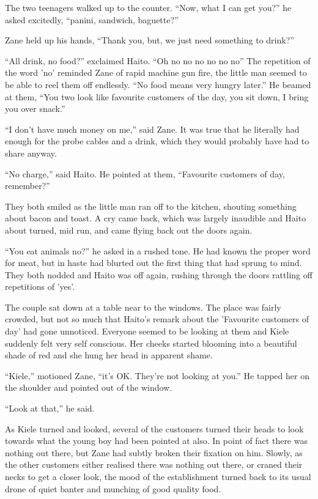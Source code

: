 The two teenagers walked up to the counter.  ``Now, what I can get you?'' he asked excitedly, ``panini, sandwich, baguette?''  

Zane held up his hands, ``Thank you, but, we just need something to drink?''

``All drink, no food?'' exclaimed Haito.  ``Oh no no no no no no''  The repetition of the word 'no' reminded Zane of rapid machine gun fire, the little man seemed to be able to reel them off endlessly.  ``No food means very hungry later.''  He beamed at them, ``You two look like favourite customers of the day, you sit down, I bring you over snack.''

``I don't have much money on me,'' said Zane.  It was true that he literally had enough for the probe cables and a drink, which they would probably have had to share anyway.

``No charge,'' said Haito.  He pointed at them, ``Favourite  customers of day, remember?''

They both smiled as the little man ran off to the kitchen, shouting something about bacon and toast.  A cry came back, which was largely inaudible and Haito about turned, mid run, and came flying back out the doors again.

``You eat animals no?'' he asked in a rushed tone.  He had known the proper word for meat, but in haste had blurted out the first thing that had sprung to mind.  They both nodded and Haito was off again, rushing through the doors rattling off repetitions of 'yes'.

The couple sat down at a table near to the windows.  The place was fairly crowded, but not so much that Haito's remark about the 'Favourite customers of day' had gone unnoticed.  Everyone seemed to be looking at them and Kiele suddenly felt very self conscious.  Her cheeks started blooming into a beautiful shade of red and she hung her head in apparent shame.

``Kiele,'' motioned Zane, ``it's OK.  They're not looking at you.''  He tapped her on the shoulder and pointed out of the window.

``Look at that,'' he said.  

As Kiele turned and looked, several of the customers turned their heads to look towards what the young boy had been pointed at also.  In point of fact there was nothing out there, but Zane had subtly broken their fixation on him.  Slowly, as the other customers either realised there was nothing out there, or craned their necks to get a closer look, the mood of the establishment turned back to its usual drone of quiet banter and munching of good quality food.

